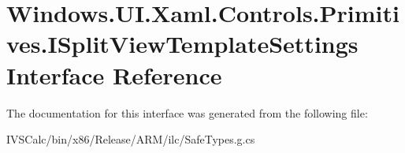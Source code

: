 \hypertarget{interface_windows_1_1_u_i_1_1_xaml_1_1_controls_1_1_primitives_1_1_i_split_view_template_settings}{}\section{Windows.\+U\+I.\+Xaml.\+Controls.\+Primitives.\+I\+Split\+View\+Template\+Settings Interface Reference}
\label{interface_windows_1_1_u_i_1_1_xaml_1_1_controls_1_1_primitives_1_1_i_split_view_template_settings}


The documentation for this interface was generated from the following file\+:\begin{DoxyCompactItemize}
\item 
I\+V\+S\+Calc/bin/x86/\+Release/\+A\+R\+M/ilc/Safe\+Types.\+g.\+cs\end{DoxyCompactItemize}
